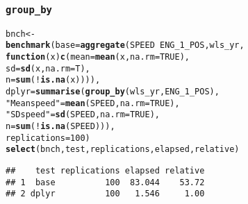 \documentclass{beamer}\usepackage[]{graphicx}\usepackage[]{color}
\makeatletter
\newcommand{\hlnum}[1]{\textcolor[rgb]{0.686,0.059,0.569}{#1}}%
\newcommand{\hlstr}[1]{\textcolor[rgb]{0.192,0.494,0.8}{#1}}%
\newcommand{\hlopt}[1]{\textcolor[rgb]{0,0,0}{#1}}%
\newcommand{\hlstd}[1]{\textcolor[rgb]{0.345,0.345,0.345}{#1}}%
\newcommand{\hlkwa}[1]{\textcolor[rgb]{0.161,0.373,0.58}{\textbf{#1}}}%
\newcommand{\hlkwb}[1]{\textcolor[rgb]{0.69,0.353,0.396}{#1}}%
\newcommand{\hlkwc}[1]{\textcolor[rgb]{0.333,0.667,0.333}{#1}}%
\newcommand{\hlkwd}[1]{\textcolor[rgb]{0.737,0.353,0.396}{\textbf{#1}}}%
\newenvironment{kframe}{%
 \def\at@end@of@kframe{}%
 \ifinner\ifhmode%
  \def\at@end@of@kframe{\end{minipage}}%
  \begin{minipage}{\columnwidth}%
 \fi\fi%
 \def\FrameCommand##1{\hskip\@totalleftmargin \hskip-\fboxsep
 \colorbox{shadecolor}{##1}\hskip-\fboxsep
     \hskip-\linewidth \hskip-\@totalleftmargin \hskip\columnwidth}%
 \MakeFramed {\advance\hsize-\width
   \@totalleftmargin\z@ \linewidth\hsize
   \@setminipage}}%
 {\par\unskip\endMakeFramed%
 \at@end@of@kframe}
\newenvironment{knitrout}{}{} %
\makeatother
\begin{document}
\begin{frame}[fragile]
  \frametitle{{\tt group\_by}}
\begin{knitrout}\footnotesize
{}\color{fgcolor}\begin{kframe}
\begin{alltt}
\hlstd{bnch} \hlkwb{<-}
  \hlkwd{benchmark}\hlstd{(}\hlkwc{base} \hlstd{=} \hlkwd{aggregate}\hlstd{(SPEED} \hlopt{~} \hlstd{ENG_1_POS, wls_yr,}
                             \hlkwa{function}\hlstd{(}\hlkwc{x}\hlstd{)} \hlkwd{c}\hlstd{(}\hlkwc{mean} \hlstd{=} \hlkwd{mean}\hlstd{(x,} \hlkwc{na.rm} \hlstd{=} \hlnum{TRUE}\hlstd{),}
                                           \hlkwc{sd}   \hlstd{=} \hlkwd{sd}\hlstd{(x,} \hlkwc{na.rm} \hlstd{= T),}
                                           \hlkwc{n}    \hlstd{=} \hlkwd{sum}\hlstd{(}\hlopt{!}\hlkwd{is.na}\hlstd{(x)))),}
            \hlkwc{dplyr} \hlstd{=} \hlkwd{summarise}\hlstd{(}\hlkwd{group_by}\hlstd{(wls_yr, ENG_1_POS),}
                              \hlstr{"Mean speed"} \hlstd{=} \hlkwd{mean}\hlstd{(SPEED,} \hlkwc{na.rm} \hlstd{=} \hlnum{TRUE}\hlstd{),}
                              \hlstr{"SD speed"}   \hlstd{=} \hlkwd{sd}\hlstd{(SPEED,} \hlkwc{na.rm} \hlstd{=} \hlnum{TRUE}\hlstd{),}
                              \hlkwc{n}            \hlstd{=} \hlkwd{sum}\hlstd{(}\hlopt{!}\hlkwd{is.na}\hlstd{(SPEED))),}
            \hlkwc{replications} \hlstd{=} \hlnum{100}\hlstd{)}
\hlkwd{select}\hlstd{(bnch, test, replications, elapsed, relative)}
\end{alltt}
\begin{verbatim}
##    test replications elapsed relative
## 1  base          100  83.044    53.72
## 2 dplyr          100   1.546     1.00
\end{verbatim}
\end{kframe}
\end{knitrout}
\end{frame} 
\end{document}

